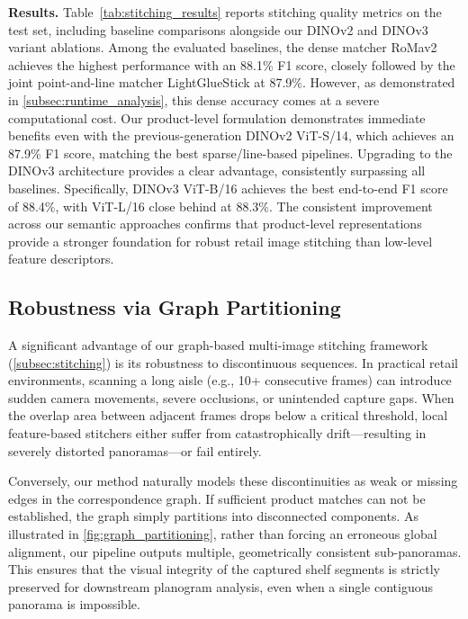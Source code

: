 \documentclass[10pt,twocolumn,letterpaper]{article}
\begin{document}
\noindent\textbf{Results.} Table~\ref{tab:stitching_results} reports stitching quality metrics on the test set, including baseline comparisons alongside our DINOv2 and DINOv3 variant ablations. 
Among the evaluated baselines, the dense matcher RoMav2 achieves the highest performance with an 88.1\% F1 score, closely followed by the joint point-and-line matcher LightGlueStick at 87.9\%. However, as demonstrated in \cref{subsec:runtime_analysis}, this dense accuracy comes at a severe computational cost.
Our product-level formulation demonstrates immediate benefits even with the previous-generation DINOv2 ViT-S/14, which achieves an 87.9\% F1 score, matching the best sparse/line-based pipelines. Upgrading to the DINOv3 architecture provides a clear advantage, consistently surpassing all baselines. Specifically, DINOv3 ViT-B/16 achieves the best end-to-end F1 score of 88.4\%, with ViT-L/16 close behind at 88.3\%. 
The consistent improvement across our semantic approaches confirms that product-level representations provide a stronger foundation for robust retail image stitching than low-level feature descriptors.

\subsection{Robustness via Graph Partitioning}
\label{subsec:graph_robustness}

A significant advantage of our graph-based multi-image stitching framework (\cref{subsec:stitching}) is its robustness to discontinuous sequences. In practical retail environments, scanning a long aisle (e.g., 10+ consecutive frames) can introduce sudden camera movements, severe occlusions, or unintended capture gaps. When the overlap area between adjacent frames drops below a critical threshold, local feature-based stitchers either suffer from catastrophically drift—resulting in severely distorted panoramas—or fail entirely.

Conversely, our method naturally models these discontinuities as weak or missing edges in the correspondence graph. If sufficient product matches can not be established, the graph simply partitions into disconnected components. As illustrated in \cref{fig:graph_partitioning}, rather than forcing an erroneous global alignment, our pipeline outputs multiple, geometrically consistent sub-panoramas. This ensures that the visual integrity of the captured shelf segments is strictly preserved for downstream planogram analysis, even when a single contiguous panorama is impossible.
\end{document}
